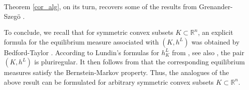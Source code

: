 \documentclass[12pt]{article}
\numberwithin{equation}{section}
\theoremstyle{theorem}
\theoremstyle{definition}
\theoremstyle{remark}
\begin{document}
	\par 
	Theorem \ref{cor_alg}, on its turn, recovers some of the results from Grenander-Szeg{\"o} \cite[\S 8.1]{GrenanSzego}.
	\par 
	To conclude, we recall that for symmetric convex subsets $K \subset \mathbb{R}^n$, an explicit formula for the equilibrium measure associated with $(K, h^L)$ was obtained by Bedford-Taylor \cite{BedfordTaylorEquil}. 
	According to Lundin's formulas for $h^L_K$ from \cite{Lundin}, see also \cite[p. 707]{BedfordTaylorEquil}, the pair $(K, h^L)$ is pluriregular. 
	It then follows from \cite[Proposition 1.13 and Theorem 1.14]{BerBoucNys} that the corresponding equilibrium measures satisfy the Bernstein-Markov property.  
	Thus, the analogues of the above result can be formulated for arbitrary symmetric convex subsets $K \subset \mathbb{R}^n$.
	
	
	
\end{document}
